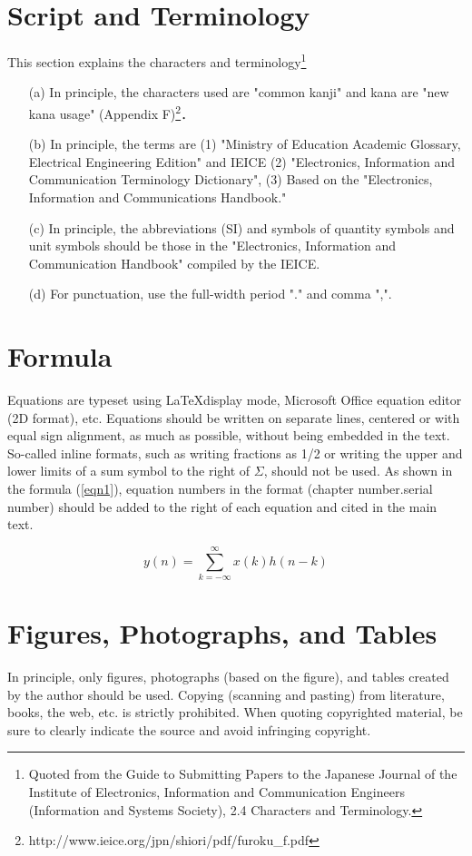 \section{Script and Terminology}
This section explains the characters and terminology\footnote{Quoted from the Guide to Submitting Papers to the Japanese Journal of the Institute of Electronics, Information and Communication Engineers (Information and Systems Society), 2.4 Characters and Terminology.}
\begin{itemize}
\item[(a)] In principle, the characters used are "common kanji" and kana are "new kana usage" (Appendix F)\footnote{http://www.ieice.org/jpn/shiori/pdf/furoku\_f.pdf}．
\item[(b)] In principle, the terms are
(1) "Ministry of Education Academic Glossary, Electrical Engineering Edition" and IEICE
(2) "Electronics, Information and Communication Terminology Dictionary",
(3) Based on the "Electronics, Information and Communications Handbook."
\item[(c)] In principle, the abbreviations (SI) and symbols of quantity symbols and unit symbols should be those in the "Electronics, Information and Communication Handbook" compiled by the IEICE.
\item[(d)] For punctuation, use the full-width period "." and comma ",".
\end{itemize}

\section{Formula}
Equations are typeset using \LaTeX display mode, Microsoft Office equation editor
(2D format), etc. Equations should be written on separate lines, centered or with equal sign alignment, as much as possible, without being embedded in the text. So-called inline formats, such as writing fractions as 1/2 or writing the upper and lower limits of a sum symbol to the right of $\Sigma$, should not be used. As shown in the formula (\ref{eqn1}), equation numbers in the format (chapter number.serial number) should be added to the right of each equation and cited in the main text.

\begin{equation}
y(n)=\sum_{k=-\infty}^{\infty}x(k)h(n-k)\label{eqn1}
\end{equation}

\section{Figures, Photographs, and Tables}
In principle, only figures, photographs (based on the figure), and tables created by the author should be used. Copying (scanning and pasting) from literature, books, the web, etc. is strictly prohibited. When quoting copyrighted material, be sure to clearly indicate the source and avoid infringing copyright.

